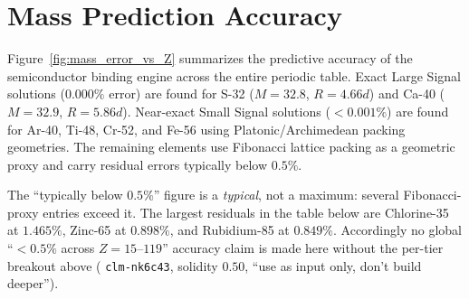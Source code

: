 \section{Mass Prediction Accuracy}

Figure~\ref{fig:mass_error_vs_Z} summarizes the predictive accuracy of the semiconductor binding engine across the entire periodic table. Exact Large Signal solutions ($0.000\%$ error) are found for S-32 ($M=32.8$, $R=4.66d$) and Ca-40 ($M=32.9$, $R=5.86d$). Near-exact Small Signal solutions ($<0.001\%$) are found for Ar-40, Ti-48, Cr-52, and Fe-56 using Platonic/Archimedean packing geometries. The remaining elements use Fibonacci lattice packing as a geometric proxy and carry residual errors typically below $0.5\%$.

The ``typically below $0.5\%$'' figure is a \emph{typical}, not a maximum: several Fibonacci-proxy entries exceed it. The largest residuals in the table below are Chlorine-35 at $1.465\%$, Zinc-65 at $0.898\%$, and Rubidium-85 at $0.849\%$. Accordingly no global ``$<0.5\%$ across $Z=15$--$119$'' accuracy claim is made here without the per-tier breakout above ( \texttt{clm-nk6c43}, solidity $0.50$, ``use as input only, don't build deeper'').

